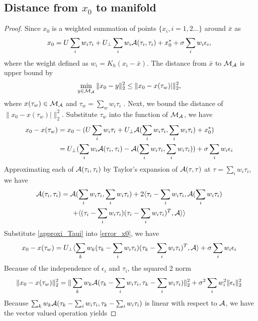\documentclass[aos,preprint]{imsart}
\theoremstyle{remark}
\begin{document}
\begin{appendix}
\subsection{Distance from $x_0$ to manifold}
\begin{proof}\label{dis_x0}
Since $x_0$ is a weighted summation of points $\{x_i, i= 1,2...\}$ around $\bar{x}$ as
\[
x_0 = U\sum_i w_i \tau_i +U_\perp \sum_i w_i {\cal A}(\tau_i,\tau_i)+ x_0^*+\sigma\sum_i w_i \epsilon_i,
\]
where the weight defined as $w_i = K_h(x_i-\bar{x})$. The distance from $\bar{x}$ to $\cal M_A$ is upper bound by 
\[
\min_{y\in {\cal M_A}} \|x_0-y\|_2^2\leq \|x_0 - x(\tau_w)|\|_2^2,
\]
where $x(\tau_w) \in {\cal M_A}$ and $\tau_w = \sum_w w_i\tau_i$ . Next, we bound the distance of $\|x_0 - x(\tau_w)|\|_2^2$. Substitute $\tau_w$ into the function of $\cal M_A$, we have
\begin{equation}\label{error_x0}
\begin{aligned}
x_0 - x(\tau_w)  &=  x_0 -(U  \sum_i w_i \tau_i+ U_\perp {\cal A}(\sum_i w_i \tau_i,\sum_i w_i \tau_i) +x_0^*)\\
& = U_\perp (\sum_i w_i {\cal A}(\tau_i,\tau_i)- {\cal A}(\sum_i w_i \tau_i,\sum_i w_i \tau_i))+\sigma\sum_i w_i \epsilon_i
\end{aligned}
\end{equation}
Approximating each of ${\cal A}(\tau_i,\tau_i)$ by Taylor's expansion of ${\cal A}(\tau,\tau)$ at $\tau = \sum_i w_i\tau_i$, we have
\begin{equation}\label{approxi_Taui}
\begin{gathered}
{\cal A}(\tau_i,\tau_i) = {\cal A}(\sum_i w_i\tau_i,\sum_i w_i\tau_i) +2\langle \tau_i-\sum_i w_i \tau_i, {\cal A}(\sum_i w_i\tau_i)\\
+ \langle (\tau_i-\sum_i w_i \tau_i )(\tau_i-\sum_i w_i \tau_i)^T,\cal A\rangle\rangle
\end{gathered}
\end{equation}
Substitute \eqref{approxi_Taui} into \eqref{error_x0}, we have
\[
x_0 - x(\tau_w)  = U_\perp  \langle \sum_k w_k (\tau_k-\sum_i w_i \tau_i )(\tau_k-\sum_i w_i \tau_i)^T,  {\cal A}\rangle +\sigma\sum_i w_i \epsilon_i
\]
Because of the independence of $\epsilon_i$ and $\tau_i$, the squared 2 norm
\[
\|x_0 - x(\tau_w) \|_2^2 =  \| \sum_k w_k {\cal A}(\tau_k-\sum_i w_i \tau_i, \tau_k-\sum_i w_i \tau_i)\|_2^2 + \sigma^2\sum_i w_i^2 \|\epsilon_i\|_2^2
\]
Because $\sum_k w_k {\cal A}(\tau_k-\sum_i w_i \tau_i, \tau_k-\sum_i w_i \tau_i)$ is linear with respect to $\cal A$, we have the vector valued operation yields 

\end{proof}
\end{appendix}
\end{document}
